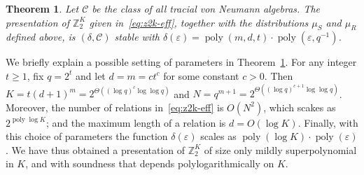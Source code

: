 \documentclass[11pt]{article}
\newtheorem{theorem}{Theorem}[section]
\theoremstyle{definition}
\newcommand{\Z}{\ensuremath{\mathbb{Z}}}
\newcommand{\mC}{\ensuremath{\mathcal{C}}}
\DeclareMathOperator{\poly}{poly}
\newcommand{\eps}{\varepsilon}
\begin{document}
\begin{theorem}\label{thm:z2-stab}
Let $\mC$ be the class of all tracial von Neumann algebras. 
The presentation of  $\Z_2^K$ given in~\eqref{eq:z2k-eff}, together with the distributions $\mu_S$ and $\mu_R$ defined above, is $(\delta,\mC)$ stable with $\delta(\eps)=\poly(m,d,t) \cdot\poly(\eps,q^{-1})$. 
\end{theorem}

We briefly explain a possible setting of parameters in Theorem~\ref{thm:z2-stab}. For any integer $t\geq 1$, fix $q=2^t$ and let $d=m=c t^c$ for some constant $c>0$. Then $K=t(d+1)^m = 2^{\Theta((\log q)^c \log\log q)}$ and $N=q^{m+1}= 2^{\Theta((\log q)^{c+1} \log\log q)}$. Moreover, the number of relations in~\eqref{eq:z2k-eff} is $O(N^2)$, which scakes as $2^{\poly\log K}$; and the maximum length of a relation is $d=O(\log K)$. Finally, with this choice of parameters the function $\delta(\eps)$ scales as $\poly(\log K)\cdot \poly(\eps)$. We have thus obtained a presentation of $\Z_2^K$ of size only mildly superpolynomial in $K$, and with soundness that depends polylogarithmically on $K$. 
\end{document}
